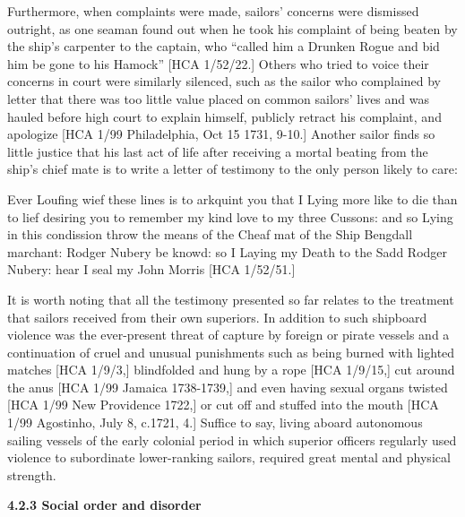 \begin{styleStandard}
Furthermore, when complaints were made, sailors’ concerns were dismissed outright, as one seaman found out when he took his complaint of being beaten by the ship’s carpenter to the captain, who “called him a Drunken Rogue and bid him be gone to his Hamock” [HCA 1/52/22.] Others who tried to voice their concerns in court were similarly silenced, such as the sailor who complained by letter that there was too little value placed on common sailors’ lives and was hauled before high court to explain himself, publicly retract his complaint, and apologize [HCA 1/99 Philadelphia, Oct 15 1731, 9-10.] Another sailor finds so little justice that his last act of life after receiving a mortal beating from the ship’s chief mate is to write a letter of testimony to the only person likely to care:
\end{styleStandard}

\begin{styleStandard}
Ever Loufing wief these lines is to arkquint you that I Lying more like to die than to lief desiring you to remember my kind love to my three Cussons: and so Lying in this condission throw the means of the Cheaf mat of the Ship Bengdall marchant: Rodger Nubery be knowd: so I Laying my Death to the Sadd Rodger Nubery: hear I seal my John Morris [HCA 1/52/51.] 
\end{styleStandard}

\begin{styleStandard}
It is worth noting that all the testimony presented so far relates to the treatment that sailors received from their own superiors. In addition to such shipboard violence was the ever-present threat of capture by foreign or pirate vessels and a continuation of cruel and unusual punishments such as being burned with lighted matches [HCA 1/9/3,] blindfolded and hung by a rope [HCA 1/9/15,] cut around the anus [HCA 1/99 Jamaica 1738-1739,] and even having sexual organs twisted [HCA 1/99 New Providence 1722,] or cut off and stuffed into the mouth [HCA 1/99 Agostinho, July 8, c.1721, 4.] Suffice to say, living aboard autonomous sailing vessels of the early colonial period in which superior officers regularly used violence to subordinate lower-ranking sailors, required great mental and physical strength.
\end{styleStandard}

\begin{styleStandard}
\textbf{4.2.3 Social order and disorder}
\end{styleStandard}

